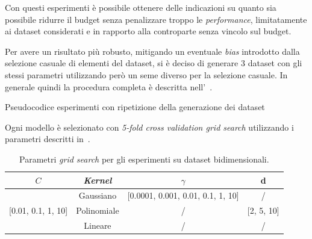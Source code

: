 Con questi esperimenti è possibile ottenere delle indicazioni su quanto sia possibile ridurre il budget senza penalizzare troppo le \emph{performance}, limitatamente ai dataset considerati e in rapporto alla controparte senza vincolo sul budget.

Per avere un risultato più robusto, mitigando un eventuale \emph{bias} introdotto dalla selezione casuale di elementi del dataset, si è deciso di generare 3 dataset con gli stessi parametri utilizzando però un seme diverso per la selezione casuale.
In generale quindi la procedura completa è descritta nell'~.
\begin{algorithm}
    \SetAlgoLined
\caption{Pseudocodice esperimenti con ripetizione della generazione dei dataset}
\label{alg:esperimenti_2}
\end{algorithm}

Ogni modello è selezionato con \emph{5-fold cross validation grid search} utilizzando i parametri descritti in~.
\begin{table}
    \centering
    \begin{tabular}{cccc}
        \toprule
        $C$ & \emph{Kernel} & $\gamma$ & d \\
        \midrule
        \multirow{3}{*}{[0.01, 0.1, 1, 10]} & Gaussiano   & [0.0001, 0.001, 0.01, 0.1, 1, 10]   & /\\
                                            \cline{2-4}
                                            & Polinomiale   & / & [2, 5, 10] \\
                                            \cline{2-4}
                                            & Lineare       & / & / \\
        \bottomrule
    \end{tabular}
    \caption{Parametri \emph{grid search} per gli esperimenti su dataset bidimensionali.}
    \label{tab:gridsearch_2d}
\end{table}

